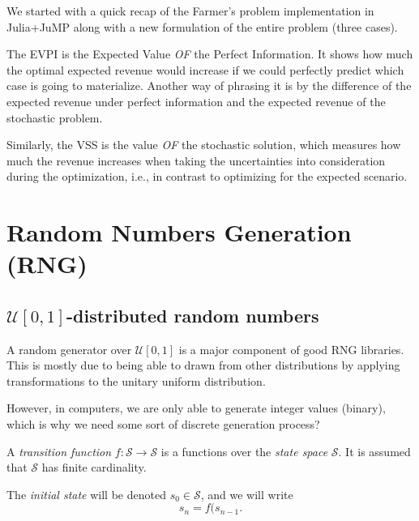 
We started with a quick recap of the Farmer's problem implementation in Julia+JuMP along with a new formulation of the entire problem (three cases).

\begin{note}
    The EVPI is the Expected Value \emph{OF} the Perfect Information.
    It shows how much the optimal expected revenue would increase if we could perfectly predict which case is going to materialize.
    Another way of phrasing it is by the difference of the expected revenue under perfect information and the expected revenue of the stochastic problem.

    Similarly, the VSS is the value \emph{OF} the stochastic solution, which measures how much the revenue increases when taking the uncertainties into consideration during the optimization, i.e., in contrast to optimizing for the expected scenario.
\end{note}


\section*{Random Numbers Generation (RNG)}

\subsection*{$\mathcal{U}[0,1]$-distributed random numbers}

A random generator over $\mathcal{U}[0,1]$ is a major component of good RNG libraries.
This is mostly due to being able to drawn from other distributions by applying transformations to the unitary uniform distribution.

However, in computers, we are only able to generate integer values (binary), which is why we need some sort of discrete generation process?

\begin{definition}
    A \emph{transition function} $f: \mathcal{S} \longrightarrow \mathcal{S}$ is a functions over the \emph{state space} $\mathcal{S}$.
    It is assumed that $\mathcal{S}$ has finite cardinality.
\end{definition}

\begin{notation}
    The \emph{initial state} will be denoted $s_0\in \mathcal{S}$, and we will write \[
    s_n = f(s_{n-1}
    .\] 
\end{notation}

